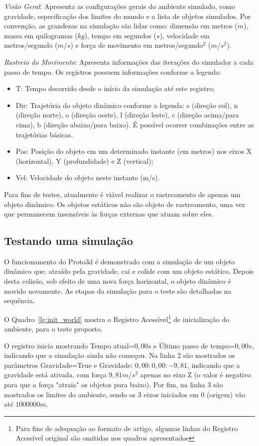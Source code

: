 \documentclass[12pt]{article}
\begin{document}
\emph{Visão Geral}: Apresenta as configurações gerais do ambiente simulado, como gravidade, especificação dos limites do mundo e a lista de objetos simulados. Por convenção, as grandezas na simulação são lidas como: dimensão em metros ($m$), massa em quilogramas ($kg$), tempo em segundos ($s$), velocidade em metros/segundo ($m/s$) e força de movimento em metros/segundo$^{2}$ ($m/s^{2}$).

\emph{Rastreio do Movimento}: Apresenta informações das iterações do simulador a cada passo de tempo. Os registros possuem informações conforme a legenda:

\begin{itemize}
	\item T: Tempo decorrido desde o início da simulação até este registro;
	\item Dir: Trajetória do objeto dinâmico conforme a legenda: s (direção sul), n (direção norte), o (direção oeste), l (direção leste), c (direção acima/para cima), b (direção abaixo/para baixo). É possível ocorrer combinações entre as trajetórias básicas. 
	\item Pos: Posição do objeto em um determinado instante (em metros) nos eixos X (horizontal), Y (profundidade) e Z (vertical);
	\item Vel: Velocidade do objeto neste instante (m/s).
\end{itemize}

Para fins de testes, atualmente é viável realizar o rastreamento de apenas um objeto dinâmico. Os objetos estáticos não são objeto de rastreamento, uma vez que permanecem insensíveis às forças externas que atuam sobre eles.

\subsection{Testando uma simulação}
O funcionamento do Proto3d é demonstrado com a simulação de um objeto dinâmico que, atraído pela gravidade, cai e colide com um objeto estático. Depois desta colisão, sob efeito de uma nova força horizontal, o objeto dinâmico é movido novamente. As etapas da simulação para o teste são detalhadas na sequência. 

O Quadro~\ref{lg:init_world} mostra o Registro Acessível\footnote{Para fins de adequação ao formato de artigo, algumas linhas do Registro Acessível original são omitidas nos quadros apresentados} de inicialização do ambiente, para o teste proposto.

O registro inicia mostrando Tempo atual=$0,00s$ e Último passo de tempo=$0,00s$, indicando que a simulação ainda não começou. Na linha 2 são mostrados os parâmetros Gravidade=True e Gravidade: $0,00:0,00:-9,81$, indicando que a gravidade está ativada, com força $9,81 m/s^{2}$ apenas no eixo Z (o valor é negativo para que a força "atraia" os objetos para baixo). Por fim, na linha 3 são mostrados os limites do ambiente, sendo os 3 eixos iniciados em $0$ (origem) vão até $1000000m$.
\end{document}
